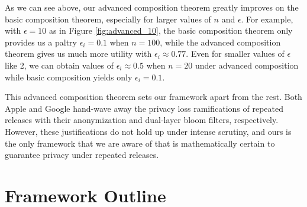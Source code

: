 \documentclass[12pt]{article}
\theoremstyle{definition}
\begin{document}
\noindent

As we can see above, our advanced composition theorem greatly improves on the basic composition theorem, especially for larger values of $n$ and $\epsilon$. For example, with $\epsilon = 10$ as in Figure \ref{fig:advanced_10}, the basic composition theorem only provides us a paltry $\epsilon _i= 0.1$ when $n = 100$, while the advanced composition theorem gives us much more utility with $\epsilon_i \approx 0.77$. Even for smaller values of $\epsilon$ like 2, we can obtain values of $\epsilon_i \approx 0.5$ when $n = 20$ under advanced composition while basic composition yields only $\epsilon_i = 0.1$.

\bigskip

This advanced composition theorem sets our framework apart from the rest. Both Apple and Google hand-wave away the privacy loss ramifications of repeated releases with their anonymization and dual-layer bloom filters, respectively. However, these justifications do not hold up under intense scrutiny, and ours is the only framework that we are aware of that is mathematically certain to guarantee privacy under repeated releases.

\section{Framework Outline}

\bigskip
\end{document}
